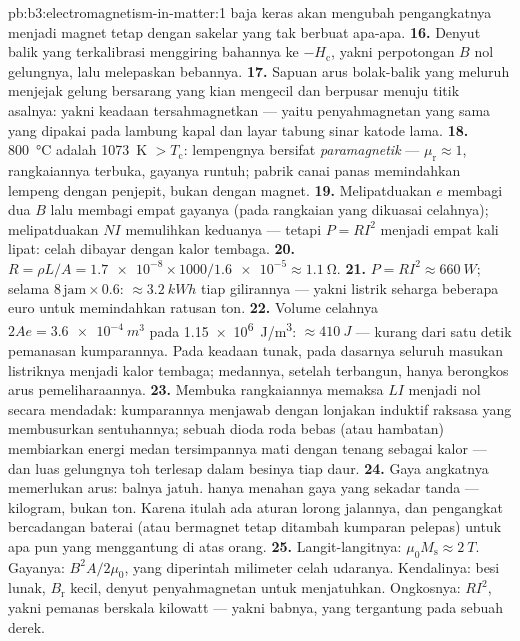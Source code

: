 \begin{solution}{pb:b3:electromagnetism-in-matter:1}
baja keras akan mengubah pengangkatnya menjadi magnet tetap dengan
sakelar yang tak berbuat apa-apa.
\textbf{16.} Denyut balik yang terkalibrasi menggiring bahannya ke
$-H_{\text{c}}$, yakni perpotongan $B$ nol gelungnya, lalu melepaskan
bebannya.
\textbf{17.} Sapuan arus bolak-balik yang meluruh menjejak gelung
bersarang yang kian mengecil dan berpusar menuju titik asalnya: yakni
keadaan tersahmagnetkan --- yaitu penyahmagnetan yang sama yang dipakai
pada lambung kapal dan layar tabung sinar katode lama.
\textbf{18.} \qty{800}{\celsius} adalah \qty{1073}{K} $> T_{\text{c}}$:
lempengnya bersifat \emph{paramagnetik} --- $\mu_{\text{r}} \approx 1$,
rangkaiannya terbuka, gayanya runtuh; pabrik canai panas memindahkan
lempeng dengan penjepit, bukan dengan magnet.
\textbf{19.} Melipatduakan $e$ membagi dua $B$ lalu membagi empat gayanya
(pada rangkaian yang dikuasai celahnya); melipatduakan $NI$ memulihkan
keduanya --- tetapi $P = RI^2$ menjadi empat kali lipat: celah dibayar
dengan kalor tembaga.
\textbf{20.} $R = \rho L/A = \num{1.7e-8}\times1000/
\num{1.6e-5} \approx \qty{1.1}{\ohm}$.
\textbf{21.} $P = RI^2 \approx \qty{660}{W}$; selama
$8\,\text{jam}\times0.6$: $\approx\qty{3.2}{kWh}$ tiap gilirannya ---
yakni listrik seharga beberapa euro untuk memindahkan ratusan ton.
\textbf{22.} Volume celahnya $2Ae = \qty{3.6e-4}{m^3}$ pada
\qty{1.15e6}{J/m^3}: $\approx\qty{410}{J}$ --- kurang dari satu
detik pemanasan kumparannya. Pada keadaan tunak, pada dasarnya seluruh
masukan listriknya menjadi kalor tembaga; medannya, setelah terbangun,
hanya berongkos arus pemeliharaannya.
\textbf{23.} Membuka rangkaiannya memaksa $LI$ menjadi nol secara
mendadak: kumparannya menjawab dengan lonjakan induktif raksasa yang
membusurkan sentuhannya; sebuah dioda roda bebas (atau hambatan)
membiarkan energi medan tersimpannya mati dengan tenang sebagai kalor ---
dan luas gelungnya toh terlesap dalam besinya tiap daur.
\textbf{24.} Gaya angkatnya memerlukan arus: balnya jatuh.
 hanya menahan gaya yang sekadar tanda --- kilogram, bukan ton.
Karena itulah ada aturan lorong jalannya, dan pengangkat bercadangan
baterai (atau bermagnet tetap ditambah kumparan pelepas) untuk apa pun
yang menggantung di atas orang.
\textbf{25.} Langit-langitnya: $\mu_0M_{\text{s}} \approx \qty{2}{T}$.
Gayanya: $B^2A/2\mu_0$, yang diperintah milimeter celah udaranya.
Kendalinya: besi lunak, $B_{\text{r}}$ kecil, denyut penyahmagnetan untuk
menjatuhkan. Ongkosnya: $RI^2$, yakni pemanas berskala kilowatt --- yakni
babnya, yang tergantung pada sebuah derek.
\end{solution}
